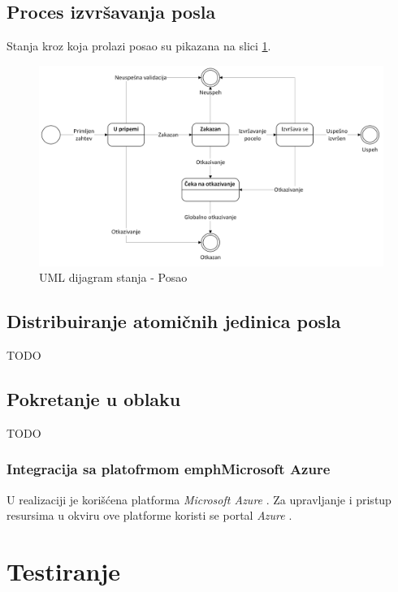 \documentclass[12pt,oneside]{memoir}
\begin{document}
\subsection{Proces izvršavanja posla}
Stanja kroz koja prolazi posao su pikazana na slici \ref{fig:stanjaposla}.

\begin{figure}[!ht]
  \centering
  \includegraphics[width=1.0\textwidth]{./images/dijagram_stanja_posao.png}
  \caption{UML dijagram stanja - Posao}
  \label{fig:stanjaposla}
\end{figure}


\subsection{Distribuiranje atomičnih jedinica posla}
TODO

\subsection{Pokretanje u oblaku}
TODO

\subsubsection{Integracija sa platofrmom emph{Microsoft Azure}}

U realizaciji je korišćena platforma \emph{Microsoft Azure} \cite{Azure}. Za upravljanje i pristup resursima u okviru ove platforme koristi se portal \emph{Azure} \cite{AzurePortal}.

\section{Testiranje}
\label{chp:testiranjesistema}
\end{document}

